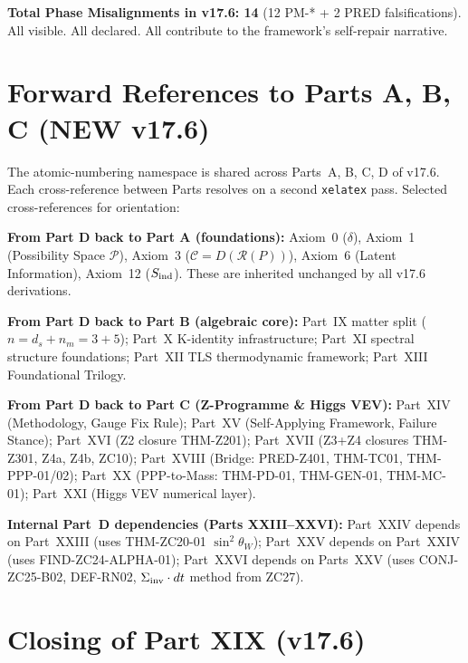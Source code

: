 \documentclass[12pt, a4paper]{article}
\begin{document}
\textbf{Total Phase Misalignments in v17.6: 14} (12 PM-* + 2 PRED falsifications).
All visible. All declared. All contribute to the framework's
self-repair narrative.

\section{Forward References to Parts A, B, C (NEW v17.6)}
\label{sec:forward-refs-v176}

The atomic-numbering namespace is shared across Parts~A, B, C, D
of v17.6. Each cross-reference between Parts resolves on a second
\texttt{xelatex} pass. Selected cross-references for orientation:

\textbf{From Part D back to Part A (foundations):}
Axiom~0 ($\delta$), Axiom~1 (Possibility Space $\mathcal{P}$),
Axiom~3 ($\mathcal{C} = D(\mathcal{R}(P))$), Axiom~6 (Latent
Information), Axiom~12 ($S_{\rm ind}$). These are inherited
unchanged by all v17.6 derivations.

\textbf{From Part D back to Part B (algebraic core):}
Part~IX matter split ($n = d_s + n_m = 3 + 5$); Part~X K-identity
infrastructure; Part~XI spectral structure foundations; Part~XII
TLS thermodynamic framework; Part~XIII Foundational Trilogy.

\textbf{From Part D back to Part C (Z-Programme \& Higgs VEV):}
Part~XIV (Methodology, Gauge Fix Rule); Part~XV (Self-Applying
Framework, Failure Stance); Part~XVI (Z2 closure THM-Z201);
Part~XVII (Z3+Z4 closures THM-Z301, Z4a, Z4b, ZC10);
Part~XVIII (Bridge: PRED-Z401, THM-TC01, THM-PPP-01/02);
Part~XX (PPP-to-Mass: THM-PD-01, THM-GEN-01, THM-MC-01);
Part~XXI (Higgs VEV numerical layer).

\textbf{Internal Part~D dependencies (Parts XXIII--XXVI):}
Part~XXIV depends on Part~XXIII (uses THM-ZC20-01 $\sin^2\theta_W$);
Part~XXV depends on Part~XXIV (uses FIND-ZC24-ALPHA-01);
Part~XXVI depends on Parts~XXV (uses CONJ-ZC25-B02, DEF-RN02,
$\Sigma_{\rm inv} \cdot dt$ method from ZC27).

\section*{Closing of Part XIX (v17.6)}
\end{document}
